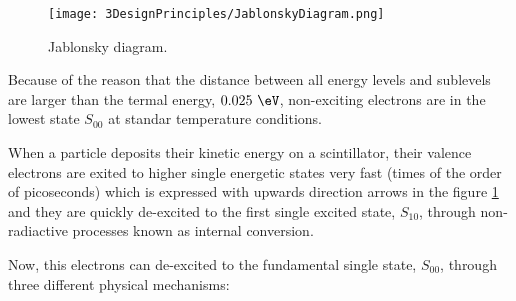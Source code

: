 \begin{figure}[htbp]
\centering
\texttt{[image: 3DesignPrinciples/JablonskyDiagram.png]}
\caption{Jablonsky diagram.\label{JablonskyDiagram}~\cite{Knoll}}
\end{figure}

Because of the reason that the distance between all energy levels and sublevels are larger than the termal energy, $0.025~\eV$, non-exciting electrons are in the lowest state $S_{00}$ at standar temperature conditions.

When a particle deposits their kinetic energy on a scintillator, their valence electrons are exited to higher single energetic states very fast (times of the order of picoseconds) which is expressed with upwards direction arrows in the figure \ref{JablonskyDiagram} and they are quickly de-excited to the first single excited state, $S_{10}$, through non-radiactive processes known as internal conversion.

Now, this electrons can de-excited to the fundamental single state, $S_{00}$, through three different physical mechanisms:

